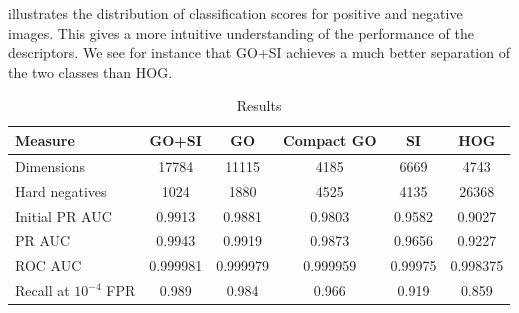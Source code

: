 \documentclass[thesis.tex]{subfiles}
\begin{document}
 illustrates the distribution of classification scores for positive and negative images. This gives a more intuitive understanding of the performance of the descriptors. We see for instance that GO+SI achieves a much better separation of the two classes than HOG.
%
\begin{table}[tb]
\centering
\begin{tabular}{ l c c c c c }
\toprule
Measure & GO+SI & GO & Compact GO & SI & HOG \\ \midrule
Dimensions & 17784 & 11115 & 4185 & 6669 & 4743 \\
Hard negatives & 1024 & 1880 & 4525 & 4135 & 26368 \\
Initial PR AUC & 0.9913 & 0.9881 & 0.9803 & 0.9582 & 0.9027 \\
PR AUC & 0.9943 & 0.9919 & 0.9873 & 0.9656 & 0.9227 \\
ROC AUC & 0.999981 & 0.999979 & 0.999959 & 0.99975 & 0.998375 \\
Recall at $10^{-4}$ FPR & 0.989 & 0.984 & 0.966 & 0.919 & 0.859 \\
\bottomrule
\end{tabular}
\caption{Results}
\label{tbl:inriaResults}
\end{table}
%
\end{document}
